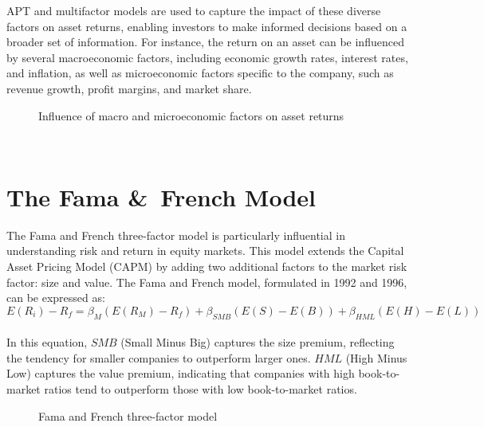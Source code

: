 \documentclass[a4paper,10pt]{article}
\begin{document}
\noindent APT and multifactor models are used to capture the impact of these diverse factors on asset returns, enabling investors to make informed decisions based on a broader set of information. For instance, the return on an asset can be influenced by several macroeconomic factors, including economic growth rates, interest rates, and inflation, as well as microeconomic factors specific to the company, such as revenue growth, profit margins, and market share.\\

\begin{figure}[h]
\centering
{}
\caption{Influence of macro and microeconomic factors on asset returns}
\end{figure}\\


\section*{The Fama \&\ French Model}
\noindent The Fama and French three-factor model is particularly influential in understanding risk and return in equity markets. This model extends the Capital Asset Pricing Model (CAPM) by adding two additional factors to the market risk factor: size and value. The Fama and French model, formulated in 1992 and 1996, can be expressed as: \\
\[E(R_i) - R_f = \beta_M (E(R_M) - R_f) + \beta_{SMB} (E(S) - E(B)) + \beta_{HML} (E(H) - E(L))\] \\
\noindent In this equation, \(SMB\) (Small Minus Big) captures the size premium, reflecting the tendency for smaller companies to outperform larger ones. \(HML\) (High Minus Low) captures the value premium, indicating that companies with high book-to-market ratios tend to outperform those with low book-to-market ratios. 

\begin{figure}[h!]
\centering
{}
\caption{Fama and French three-factor model}
\end{figure}
\end{document}
